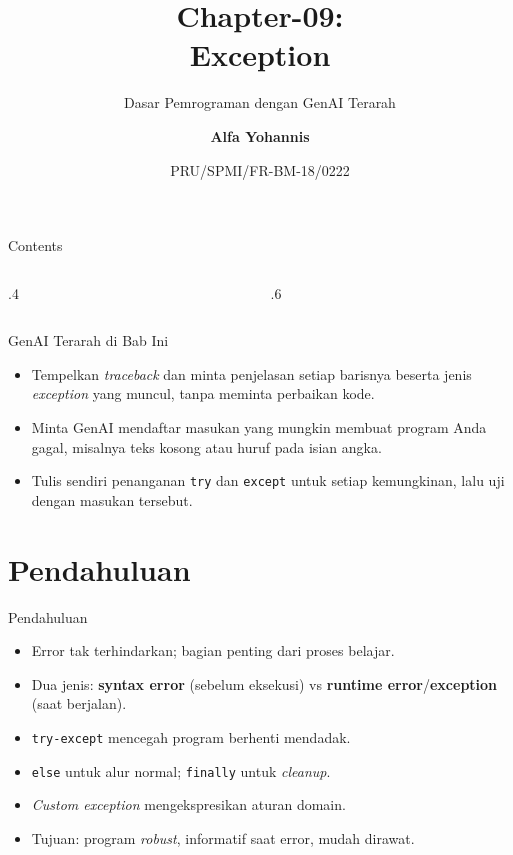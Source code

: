 \documentclass[aspectratio=169, table]{beamer}
\subtitle{Dasar Pemrograman dengan GenAI Terarah}
\title{Chapter-09:\\\LARGE{Exception\\}
\vspace{10pt}}
\date[Serial]{\scriptsize {PRU/SPMI/FR-BM-18/0222}}
\author[Pradita]{\small{\textbf{Alfa Yohannis}}}
\begin{document}
\frame{\titlepage}

\begin{frame}[fragile]{Contents}
\vspace{15pt}
\begin{columns}[t]
\begin{column}{.4\textwidth}
\tableofcontents[sections={1-4}]
\end{column}
\begin{column}{.6\textwidth}
\tableofcontents[sections={5-7}]
\end{column}
\end{columns}
\end{frame}


\begin{frame}{GenAI Terarah di Bab Ini}
\small
\begin{itemize}
  \item Tempelkan \textit{traceback} dan minta penjelasan setiap barisnya beserta jenis \textit{exception} yang muncul, tanpa meminta perbaikan kode.
  \item Minta GenAI mendaftar masukan yang mungkin membuat program Anda gagal, misalnya teks kosong atau huruf pada isian angka.
  \item Tulis sendiri penanganan \texttt{try} dan \texttt{except} untuk setiap kemungkinan, lalu uji dengan masukan tersebut.
\end{itemize}
\end{frame}

\section{Pendahuluan}
\begin{frame}[fragile]{Pendahuluan}
\vspace*{20pt}
\begin{itemize}
  \item Error tak terhindarkan; bagian penting dari proses belajar.
  \item Dua jenis: \textbf{syntax error} (sebelum eksekusi) vs \textbf{runtime error}/\textbf{exception} (saat berjalan).
  \item \texttt{try-except} mencegah program berhenti mendadak.
  \item \texttt{else} untuk alur normal; \texttt{finally} untuk \emph{cleanup}.
  \item \emph{Custom exception} mengekspresikan aturan domain.
  \item Tujuan: program \emph{robust}, informatif saat error, mudah dirawat.
\end{itemize}
\end{frame}
\end{document}
